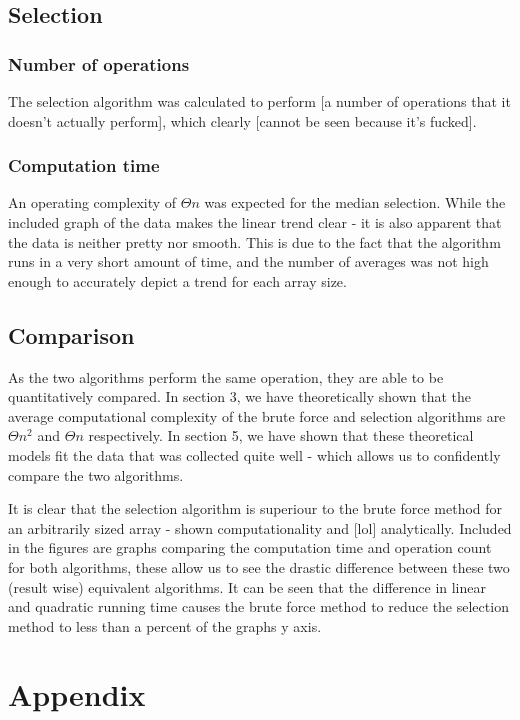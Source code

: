 \documentclass{article}
\begin{document}
    \subsection{Selection}
        \subsubsection{Number of operations}
            The selection algorithm was calculated to perform [a number of operations that it doesn't actually perform], which clearly [cannot be seen because it's fucked].
        \subsubsection{Computation time}
            An operating complexity of $\Theta{n}$ was expected for the median selection. While the included graph of the data makes the linear trend clear - it is also apparent that the data is neither pretty nor smooth. This is due to the fact that the algorithm runs in a very short amount of time, and the number of averages was not high enough to accurately depict a trend for each array size. 
    \subsection{Comparison}
        As the two algorithms perform the same operation, they are able to be quantitatively compared. In section 3, we have theoretically shown that the average computational complexity of the brute force and selection algorithms are $\Theta{n^2}$ and $\Theta{n}$ respectively. In section 5, we have shown that these theoretical models fit the data that was collected quite well - which allows us to confidently compare the two algorithms.

        It is clear that the selection algorithm is superiour to the brute force method for an arbitrarily sized array - shown computationality and [lol] analytically. Included in the figures are graphs comparing the computation time and operation count for both algorithms, these allow us to see the drastic difference between these two (result wise) equivalent algorithms. It can be seen that the difference in linear and quadratic running time causes the brute force method to reduce the selection method to less than a percent of the graphs y axis.

\section{Appendix}
\end{document}
